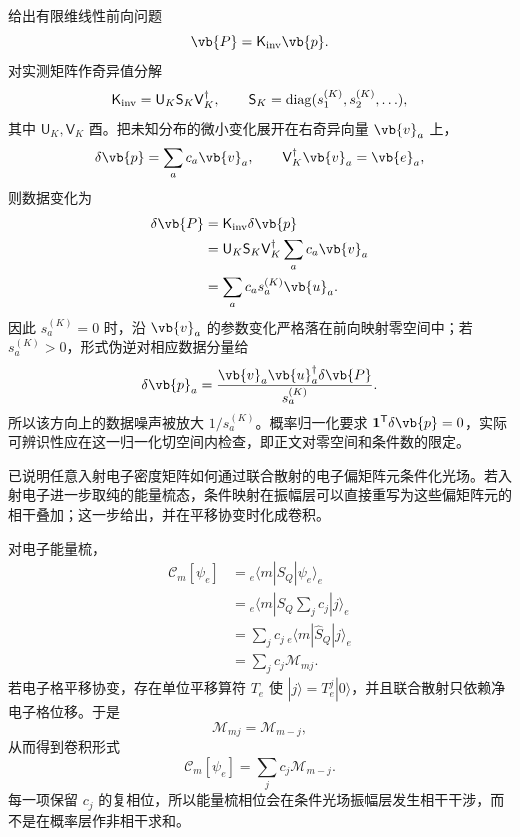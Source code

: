 \begin{exbox}[光子统计反演与电子后选择条件操作]
\medskip

 给出有限维线性前向问题
\[
\vb{P}=\mathsf K_{\rm inv}\vb{p}.
\]
对实测矩阵作奇异值分解
\[
\mathsf K_{\rm inv}=\mathsf U_K\mathsf S_K\mathsf V_K^\dagger,
\qquad
\mathsf S_K=\operatorname{diag}(s_1^{(K)},s_2^{(K)},\ldots),
\]
其中 $\mathsf U_K,\mathsf V_K$ 酉。把未知分布的微小变化展开在右奇异向量 $\vb{v}_a$ 上，
\[
\delta\vb{p}=\sum_a c_a\vb{v}_a,
\qquad
\mathsf V_K^\dagger\vb{v}_a=\vb{e}_a,
\]
则数据变化为
\begin{align*}
\delta\vb{P}
&=\mathsf K_{\rm inv}\delta\vb{p}\\
&=\mathsf U_K\mathsf S_K\mathsf V_K^\dagger
\sum_a c_a\vb{v}_a\\
&=\sum_a c_a s_a^{(K)}\vb{u}_a.
\end{align*}
因此 $s_a^{(K)}=0$ 时，沿 $\vb{v}_a$ 的参数变化严格落在前向映射零空间中；若 $s_a^{(K)}>0$，形式伪逆对相应数据分量给
\[
\delta\vb{p}_a
=\frac{\vb{v}_a\vb{u}_a^\dagger\delta\vb{P}}{s_a^{(K)}}.
\]
所以该方向上的数据噪声被放大 $1/s_a^{(K)}$。概率归一化要求 $\mathbf 1^{\mathsf T}\delta\vb{p}=0$，实际可辨识性应在这一归一化切空间内检查，即正文对零空间和条件数的限定。

\medskip

 已说明任意入射电子密度矩阵如何通过联合散射的电子偏矩阵元条件化光场。若入射电子进一步取纯的能量梳态，条件映射在振幅层可以直接重写为这些偏矩阵元的相干叠加；这一步给出，并在平移协变时化成卷积。

对电子能量梳，\begin{align*}
\mathscr C_m[\psi_e]
&={}_e\!\langle m|\hat S_Q|\psi_e\rangle_e\\
&={}_e\!\langle m|\hat S_Q
\sum_jc_j|j\rangle_e\\
&=\sum_jc_j\,{}_e\!\langle m|\hat S_Q|j\rangle_e\\
&=\sum_jc_j\mathscr M_{mj}.
\end{align*}
若电子格平移协变，存在单位平移算符 $T_e$ 使 $|j\rangle=T_e^j|0\rangle$，并且联合散射只依赖净电子格位移。于是
\[
\mathscr M_{mj}=\mathscr M_{m-j},
\]
从而得到卷积形式
\[
\mathscr C_m[\psi_e]
=\sum_jc_j\mathscr M_{m-j}.
\]
每一项保留 $c_j$ 的复相位，所以能量梳相位会在条件光场振幅层发生相干干涉，而不是在概率层作非相干求和。
\end{exbox}





